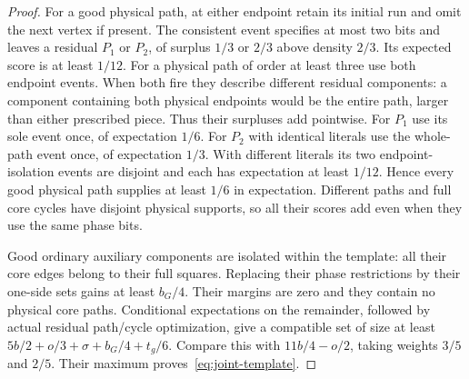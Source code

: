 \documentclass[11pt]{article}
\begin{document}
\begin{proof}
For a good physical path, at either endpoint retain its initial run
and omit the next vertex if present. The consistent event specifies
at most two bits and leaves a residual $P_1$ or $P_2$, of surplus $1/3$
or $2/3$ above density $2/3$. Its expected score is at least $1/12$.
For a physical path of order at least three use both endpoint events.
When both fire they describe different residual components: a component
containing both physical endpoints would be the entire path, larger
than either prescribed piece. Thus their surpluses add pointwise.
For $P_1$ use its sole event once, of expectation $1/6$. For $P_2$ with
identical literals use the whole-path event once, of expectation $1/3$.
With different literals its two endpoint-isolation events are disjoint
and each has expectation at least $1/12$. Hence every good physical path
supplies at least $1/6$ in expectation. Different paths and full core
cycles have disjoint physical supports, so all their scores add even
when they use the same phase bits.

Good ordinary auxiliary components are isolated within the template:
all their core edges belong to their full squares. Replacing their
phase restrictions by their one-side sets gains at least $b_G/4$.
Their margins are zero and they contain no physical core paths.
Conditional expectations on the remainder, followed by actual residual
path/cycle optimization, give a compatible set of size at least
$5b/2+o/3+\sigma+b_G/4+t_g/6$.
Compare this with $11b/4-o/2$, taking weights $3/5$ and $2/5$.
Their maximum proves~\eqref{eq:joint-template}.
\end{proof}
\end{document}
